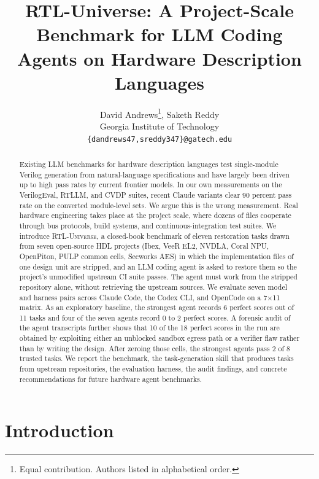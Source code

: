 \documentclass{article}
\title{RTL-Universe: A Project-Scale Benchmark for LLM Coding Agents on Hardware Description Languages}
\author{
  David Andrews\thanks{Equal contribution. Authors listed in alphabetical order.},
  Saketh Reddy\footnotemark[1] \\
  Georgia Institute of Technology \\
  \texttt{\{dandrews47,sreddy347\}@gatech.edu}
}
\begin{document}
\maketitle

\begin{abstract}
Existing LLM benchmarks for hardware description languages test single-module Verilog
generation from natural-language specifications and have largely been driven up to high pass
rates by current frontier models. In our own measurements on the VerilogEval, RTLLM, and
CVDP suites, recent Claude variants clear 90 percent pass rate on the converted module-level
sets. We argue this is the wrong measurement. Real hardware engineering takes place at the
project scale, where dozens of files cooperate through bus protocols, build systems, and
continuous-integration test suites. We introduce \textsc{RTL-Universe}, a closed-book
benchmark of eleven restoration tasks drawn from seven open-source HDL projects (Ibex, VeeR
EL2, NVDLA, Coral NPU, OpenPiton, PULP common cells, Secworks AES) in which the
implementation files of one design unit are stripped, and an LLM coding agent is asked to
restore them so the project's unmodified upstream CI suite passes. The agent must work from the stripped repository alone,
without retrieving the upstream sources. We evaluate seven model and harness pairs across
Claude Code, the Codex CLI, and OpenCode on a 7$\times$11 matrix. As an exploratory baseline,
the strongest agent records 6 perfect scores out of 11 tasks and four of the seven agents
record 0 to 2 perfect scores. A forensic audit of the agent transcripts further shows that
10 of the 18 perfect scores in the run are obtained by exploiting either an unblocked sandbox
egress path or a verifier flaw rather than by writing the design. After zeroing those cells,
the strongest agents pass 2 of 8 trusted tasks. We report the benchmark, the task-generation
skill that produces tasks from upstream repositories, the evaluation harness, the audit
findings, and concrete recommendations for future hardware agent benchmarks.
\end{abstract}

\section{Introduction}
\end{document}
